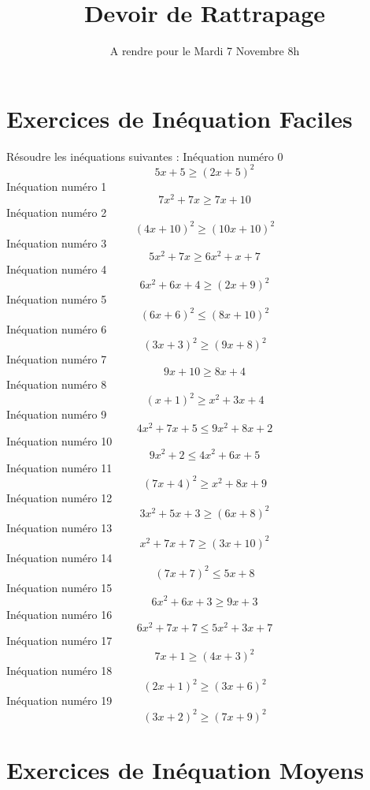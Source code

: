 \documentclass{article}
\title{Devoir de Rattrapage}
\date{A rendre pour le Mardi 7 Novembre 8h}\usepackage{natbib}
\begin{document}
\maketitle
 \section{Exercices de In\'equation Faciles}

 R\'esoudre les in\'equations suivantes : 
In\'equation num\'ero 0 \[5 x + 5 \geq \left(2 x + 5\right)^{2}\]In\'equation num\'ero 1 \[7 x^{2} + 7 x \geq 7 x + 10\]In\'equation num\'ero 2 \[\left(4 x + 10\right)^{2} \geq \left(10 x + 10\right)^{2}\]In\'equation num\'ero 3 \[5 x^{2} + 7 x \geq 6 x^{2} + x + 7\]In\'equation num\'ero 4 \[6 x^{2} + 6 x + 4 \geq \left(2 x + 9\right)^{2}\]In\'equation num\'ero 5 \[\left(6 x + 6\right)^{2} \leq \left(8 x + 10\right)^{2}\]In\'equation num\'ero 6 \[\left(3 x + 3\right)^{2} \geq \left(9 x + 8\right)^{2}\]In\'equation num\'ero 7 \[9 x + 10 \geq 8 x + 4\]In\'equation num\'ero 8 \[\left(x + 1\right)^{2} \geq x^{2} + 3 x + 4\]In\'equation num\'ero 9 \[4 x^{2} + 7 x + 5 \leq 9 x^{2} + 8 x + 2\]In\'equation num\'ero 10 \[9 x^{2} + 2 \leq 4 x^{2} + 6 x + 5\]In\'equation num\'ero 11 \[\left(7 x + 4\right)^{2} \geq x^{2} + 8 x + 9\]In\'equation num\'ero 12 \[3 x^{2} + 5 x + 3 \geq \left(6 x + 8\right)^{2}\]In\'equation num\'ero 13 \[x^{2} + 7 x + 7 \geq \left(3 x + 10\right)^{2}\]In\'equation num\'ero 14 \[\left(7 x + 7\right)^{2} \leq 5 x + 8\]In\'equation num\'ero 15 \[6 x^{2} + 6 x + 3 \geq 9 x + 3\]In\'equation num\'ero 16 \[6 x^{2} + 7 x + 7 \leq 5 x^{2} + 3 x + 7\]In\'equation num\'ero 17 \[7 x + 1 \geq \left(4 x + 3\right)^{2}\]In\'equation num\'ero 18 \[\left(2 x + 1\right)^{2} \geq \left(3 x + 6\right)^{2}\]In\'equation num\'ero 19 \[\left(3 x + 2\right)^{2} \geq \left(7 x + 9\right)^{2}\]
 \section{Exercices de In\'equation Moyens}
\end{document}

